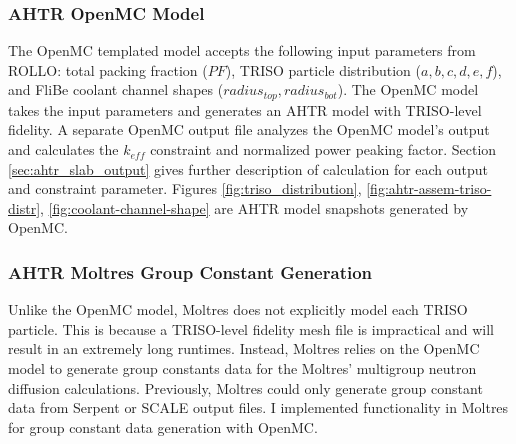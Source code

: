 \subsubsection{AHTR OpenMC Model}
The OpenMC templated model accepts the following input parameters from \gls{ROLLO}: 
total packing fraction ($PF$), TRISO particle distribution ($a, b, c, d, e, f$), 
and FliBe coolant channel shapes ($radius_{top}, radius_{bot}$). 
The OpenMC model takes the input parameters and generates an \gls{AHTR} model with 
\gls{TRISO}-level fidelity. 
A separate OpenMC output file analyzes the OpenMC model's output and 
calculates the $k_{eff}$ constraint and normalized power peaking factor.
Section \ref{sec:ahtr_slab_output} gives further description of calculation for 
each output and constraint parameter.
Figures \ref{fig:triso_distribution}, \ref{fig:ahtr-assem-triso-distr},
\ref{fig:coolant-channel-shape} are \gls{AHTR} model snapshots generated by OpenMC. 

\subsubsection{AHTR Moltres Group Constant Generation}
\label{sec:ahtr-moltres-group-constant-gen}
Unlike the OpenMC model, Moltres does not explicitly model each \gls{TRISO}
particle. 
This is because a TRISO-level fidelity mesh file is impractical and will result in an 
extremely long runtimes. 
Instead, Moltres relies on the OpenMC model to generate group constants data for the 
Moltres' multigroup neutron diffusion calculations. 
Previously, Moltres could only generate group constant data from Serpent 
\cite{leppanen_serpent_2014} or SCALE \cite{bucholz_scale:_1982} output files. 
I implemented functionality in Moltres for group constant data generation with 
OpenMC. 

